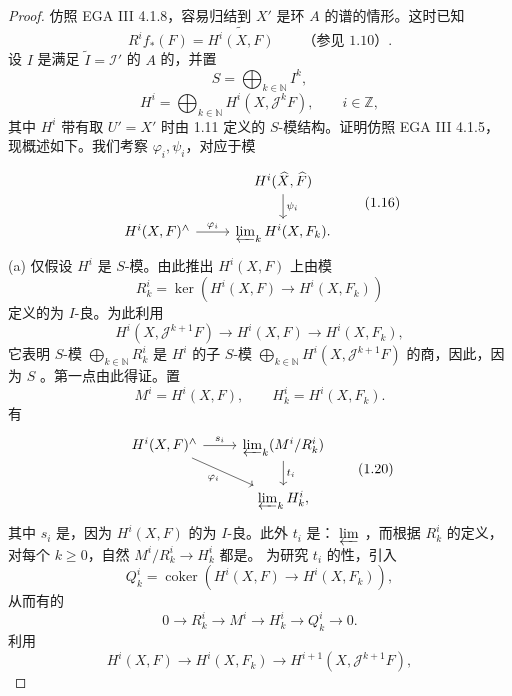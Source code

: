 \begin{proof}
仿照 EGA III 4.1.8，容易归结到 $X'$ 是环 $A$ 的谱的情形。这时已知
\[R^if_*(F)=\widetilde{H^i(X,F)}\qquad\text{（参见 1.10）}.\tag{1.13}\]
设 $I$ 是满足 $\widetilde I=\mathcal I'$ 的 $A$ 的，并置
\[S=\bigoplus_{k\in\mathbb N}I^k,\tag{1.14}\]
\[H^i=\bigoplus_{k\in\mathbb N}H^i(X,\mathcal J^kF),\qquad i\in\mathbb Z,\tag{1.15}\]
其中 $H^i$ 带有取 $U'=X'$ 时由 1.11 定义的 $S$-模结构。证明仿照 EGA III 4.1.5，现概述如下。我们考察 $\varphi_i,\psi_i$，对应于模
\[\begin{tikzcd}&H^i(\widehat X,\widehat F)\arrow[d,"\psi_i"]\\H^i(X,F)^\wedge\arrow[r,"\varphi_i"]&\varprojlim_k H^i(X,F_k).
\end{tikzcd}\tag{1.16}\]
(a) 仅假设 $H^i$ 是 $S$-模。由此推出 $H^i(X,F)$ 上由模
\[R^i_k=\ker(H^i(X,F)\to H^i(X,F_k))\tag{1.17}\]
定义的为 $I$-良。为此利用
\[H^i(X,\mathcal J^{k+1}F)\longrightarrow H^i(X,F)\longrightarrow H^i(X,F_k),\tag{1.18}\]
它表明 $S$-模 $\bigoplus_{k\in\mathbb N}R^i_k$ 是 $H^i$ 的子 $S$-模 $\bigoplus_{k\in\mathbb N}H^i(X,\mathcal J^{k+1}F)$ 的商，因此，因为 $S$ 。第一点由此得证。置
\[M^i=H^i(X,F),\qquad H^i_k=H^i(X,F_k).\tag{1.19}\]
有
\[\begin{tikzcd}H^i(X,F)^\wedge\arrow[r,"s_i"]\arrow[dr,"\varphi_i"']&\varprojlim_k(M^i/R^i_k)\arrow[d,"t_i"]\\&\varprojlim_k H^i_k,\end{tikzcd}\tag{1.20}\]
其中 $s_i$ 是，因为 $H^i(X,F)$ 的为 $I$-良。此外 $t_i$ 是： $\varprojlim$ ，而根据 $R^i_k$ 的定义，对每个 $k\geq0$，自然 $M^i/R^i_k\to H^i_k$ 都是。
为研究 $t_i$ 的性，引入
\[Q^i_k=\operatorname{coker}(H^i(X,F)\to H^i(X,F_k)),\tag{1.21}\]
从而有的
\[0\longrightarrow R^i_k\longrightarrow M^i\longrightarrow H^i_k\longrightarrow Q^i_k\longrightarrow0.\tag{1.22}\]
利用
\[H^i(X,F)\longrightarrow H^i(X,F_k)\longrightarrow H^{i+1}(X,\mathcal J^{k+1}F),\tag{1.23}\]

\end{proof}
